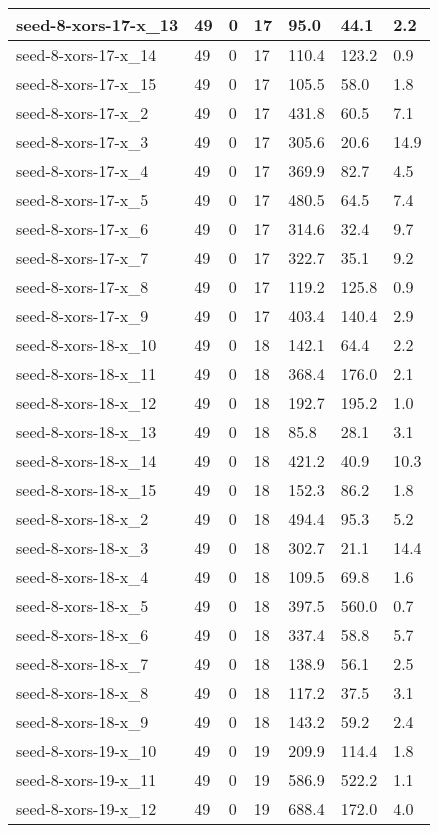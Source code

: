 \begin{scriptsize}
\begin{longtable}{|p{5cm}|l|l|l|l|l|l|}
seed-8-xors-17-x\_13&49&0&17&95.0&44.1&2.2 \\ \hline 
seed-8-xors-17-x\_14&49&0&17&110.4&123.2&0.9 \\ \hline 
seed-8-xors-17-x\_15&49&0&17&105.5&58.0&1.8 \\ \hline 
seed-8-xors-17-x\_2&49&0&17&431.8&60.5&7.1 \\ \hline 
seed-8-xors-17-x\_3&49&0&17&305.6&20.6&14.9 \\ \hline 
seed-8-xors-17-x\_4&49&0&17&369.9&82.7&4.5 \\ \hline 
seed-8-xors-17-x\_5&49&0&17&480.5&64.5&7.4 \\ \hline 
seed-8-xors-17-x\_6&49&0&17&314.6&32.4&9.7 \\ \hline 
seed-8-xors-17-x\_7&49&0&17&322.7&35.1&9.2 \\ \hline 
seed-8-xors-17-x\_8&49&0&17&119.2&125.8&0.9 \\ \hline 
seed-8-xors-17-x\_9&49&0&17&403.4&140.4&2.9 \\ \hline 
seed-8-xors-18-x\_10&49&0&18&142.1&64.4&2.2 \\ \hline 
seed-8-xors-18-x\_11&49&0&18&368.4&176.0&2.1 \\ \hline 
seed-8-xors-18-x\_12&49&0&18&192.7&195.2&1.0 \\ \hline 
seed-8-xors-18-x\_13&49&0&18&85.8&28.1&3.1 \\ \hline 
seed-8-xors-18-x\_14&49&0&18&421.2&40.9&10.3 \\ \hline 
seed-8-xors-18-x\_15&49&0&18&152.3&86.2&1.8 \\ \hline 
seed-8-xors-18-x\_2&49&0&18&494.4&95.3&5.2 \\ \hline 
seed-8-xors-18-x\_3&49&0&18&302.7&21.1&14.4 \\ \hline 
seed-8-xors-18-x\_4&49&0&18&109.5&69.8&1.6 \\ \hline 
seed-8-xors-18-x\_5&49&0&18&397.5&560.0&0.7 \\ \hline 
seed-8-xors-18-x\_6&49&0&18&337.4&58.8&5.7 \\ \hline 
seed-8-xors-18-x\_7&49&0&18&138.9&56.1&2.5 \\ \hline 
seed-8-xors-18-x\_8&49&0&18&117.2&37.5&3.1 \\ \hline 
seed-8-xors-18-x\_9&49&0&18&143.2&59.2&2.4 \\ \hline 
seed-8-xors-19-x\_10&49&0&19&209.9&114.4&1.8 \\ \hline 
seed-8-xors-19-x\_11&49&0&19&586.9&522.2&1.1 \\ \hline 
seed-8-xors-19-x\_12&49&0&19&688.4&172.0&4.0 \\ \hline 

\end{longtable}
\end{scriptsize}
